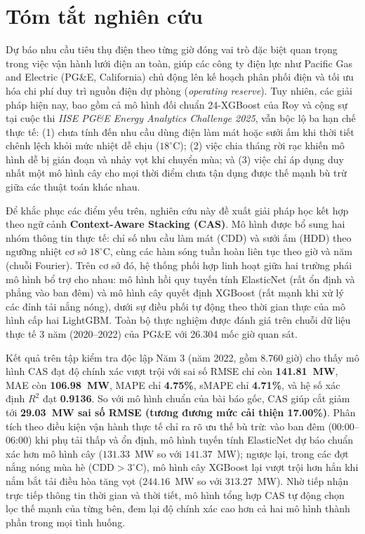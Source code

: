 \section{Tóm tắt nghiên cứu}
\label{sec:abstract}

Dự báo nhu cầu tiêu thụ điện theo từng giờ đóng vai trò đặc biệt quan trọng trong việc vận hành lưới điện an toàn, giúp các công ty điện lực như Pacific Gas and Electric (PG\&E, California) chủ động lên kế hoạch phân phối điện và tối ưu hóa chi phí duy trì nguồn điện dự phòng (\textit{operating reserve}). Tuy nhiên, các giải pháp hiện nay, bao gồm cả mô hình đối chuẩn 24-XGBoost của Roy và cộng sự~\cite{roy2025hourly} tại cuộc thi \textit{IISE PG\&E Energy Analytics Challenge 2025}, vẫn bộc lộ ba hạn chế thực tế: (1) chưa tính đến nhu cầu dùng điện làm mát hoặc sưởi ấm khi thời tiết chênh lệch khỏi mức nhiệt dễ chịu ($18^\circ\text{C}$); (2) việc chia tháng rời rạc khiến mô hình dễ bị gián đoạn và nhảy vọt khi chuyển mùa; và (3) việc chỉ áp dụng duy nhất một mô hình cây cho mọi thời điểm chưa tận dụng được thế mạnh bù trừ giữa các thuật toán khác nhau.

Để khắc phục các điểm yếu trên, nghiên cứu này đề xuất giải pháp học kết hợp theo ngữ cảnh \textbf{Context-Aware Stacking (CAS)}. Mô hình được bổ sung hai nhóm thông tin thực tế: chỉ số nhu cầu làm mát (CDD) và sưởi ấm (HDD) theo ngưỡng nhiệt cơ sở $18^\circ\text{C}$, cùng các hàm sóng tuần hoàn liên tục theo giờ và năm (chuỗi Fourier). Trên cơ sở đó, hệ thống phối hợp linh hoạt giữa hai trường phái mô hình bổ trợ cho nhau: mô hình hồi quy tuyến tính ElasticNet (rất ổn định và phẳng vào ban đêm) và mô hình cây quyết định XGBoost (rất mạnh khi xử lý các đỉnh tải nắng nóng), dưới sự điều phối tự động theo thời gian thực của mô hình cấp hai LightGBM. Toàn bộ thực nghiệm được đánh giá trên chuỗi dữ liệu thực tế 3 năm (2020--2022) của PG\&E với 26.304 mốc giờ quan sát.

Kết quả trên tập kiểm tra độc lập Năm 3 (năm 2022, gồm 8.760 giờ) cho thấy mô hình CAS đạt độ chính xác vượt trội với sai số RMSE chỉ còn \textbf{141.81~MW}, MAE còn \textbf{106.98~MW}, MAPE chỉ \textbf{4.75\%}, sMAPE chỉ \textbf{4.71\%}, và hệ số xác định $R^2$ đạt \textbf{0.9136}. So với mô hình chuẩn của bài báo gốc, CAS giúp cắt giảm tới \textbf{29.03~MW sai số RMSE (tương đương mức cải thiện 17.00\%)}. Phân tích theo điều kiện vận hành thực tế chỉ ra rõ ưu thế bù trừ: vào ban đêm (00:00--06:00) khi phụ tải thấp và ổn định, mô hình tuyến tính ElasticNet dự báo chuẩn xác hơn mô hình cây ($131.33$~MW so với $141.37$~MW); ngược lại, trong các đợt nắng nóng mùa hè ($\text{CDD} > 3^\circ\text{C}$), mô hình cây XGBoost lại vượt trội hơn hẳn khi nắm bắt tải điều hòa tăng vọt ($244.16$~MW so với $313.27$~MW). Nhờ tiếp nhận trực tiếp thông tin thời gian và thời tiết, mô hình tổng hợp CAS tự động chọn lọc thế mạnh của từng bên, đem lại độ chính xác cao hơn cả hai mô hình thành phần trong mọi tình huống.

